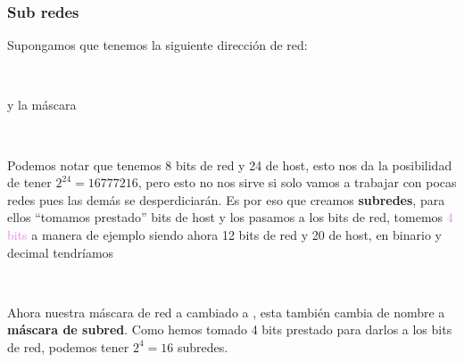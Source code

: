 \documentclass[
	12pt, %
	fleqn, %
	a4paper, %
]{LegrandOrangeBook}
\begin{document}
\subsubsection{Sub redes}
Supongamos que tenemos la siguiente dirección de red:
\begin{center}
\\
\end{center}
y la máscara\\
\begin{center}
\\
\end{center}
Podemos notar que tenemos 8 bits de red y 24 de host, esto nos da la posibilidad de tener $2^24=16 777 216$, pero esto no nos sirve si solo vamos a trabajar con pocas redes pues las demás se desperdiciarán. Es por eso que creamos \textbf{subredes}, para ellos ``tomamos prestado'' bits de host y los pasamos a los bits de red, tomemos \textcolor{violet}{4 bits} a manera de ejemplo siendo ahora 12 bits de red y 20 de host, en binario y decimal tendríamos\\
\begin{center}
\\
\end{center}
Ahora nuestra máscara de red a cambiado a , esta también cambia de nombre a \textbf{máscara de subred}. Como hemos tomado 4 bits prestado para darlos a los bits de red, podemos tener $2^4=16$ subredes.
\end{document}
